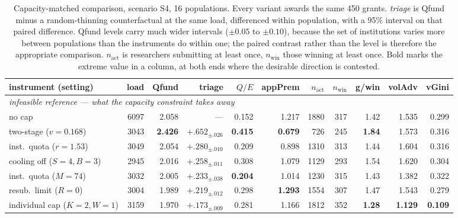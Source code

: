\documentclass[11pt,a4paper]{article}
\begin{document}
\begin{table}[!htbp]
\centering
\footnotesize
\setlength{\tabcolsep}{3.6pt}
\caption{Capacity-matched comparison, scenario S4, 16 populations. Every variant
awards the same 450 grants. \emph{triage} is Qfund minus a random-thinning
counterfactual at the same load, differenced within population, with a 95\%
interval on that paired difference. Qfund levels carry much wider intervals
($\pm0.05$ to $\pm0.10$), because the set of institutions varies more between
populations than the instruments do within one; the paired contrast rather than
the level is therefore the appropriate comparison. $n_{\text{act}}$ is
researchers submitting at least once, $n_{\text{win}}$ those winning at least
once. Bold marks the extreme value in a column, at both ends where the desirable
direction is contested.}
\label{tab:cap}
\begin{tabular}{lrrrrrrrrrr}
\toprule
instrument (setting) & load & Qfund & triage & $Q/E$ & appPrem & $n_{\text{act}}$ & $n_{\text{win}}$ & g/win & volAdv & vGini \\
\midrule
\multicolumn{11}{l}{\textit{infeasible reference --- what the capacity constraint takes away}}\\
no cap                         & 6097 & 2.058 & ---  & 0.152 & 1.217 & 1880 & 317 & 1.42 & 1.535 & 0.299 \\
\midrule
two-stage ($v{=}0.168$)        & 3043 & \textbf{2.426} & $+.652_{\pm.026}$ & \textbf{0.415} & \textbf{0.679} &  726 & 245 & \textbf{1.84} & 1.573 & 0.316 \\
inst.\ quota ($r{=}1.53$)      & 3049 & 2.054 & $+.280_{\pm.010}$ & 0.209 & 0.898 & 1310 & 313 & 1.44 & 1.604 & 0.316 \\
cooling off ($S{=}4,B{=}3$)    & 2945 & 2.016 & $+.258_{\pm.011}$ & 0.308 & 1.079 & 1129 & 293 & 1.54 & 1.620 & 0.304 \\
inst.\ quota ($M{=}74$)        & 3032 & 2.005 & $+.233_{\pm.038}$ & \textbf{0.204} & 1.014 & 1230 & 315 & 1.43 & 1.382 & 0.322 \\
resub.\ limit ($R{=}0$)        & 3004 & 1.989 & $+.219_{\pm.012}$ & 0.298 & \textbf{1.293} & 1554 & 307 & 1.47 & 1.543 & 0.279 \\
individual cap ($K{=}2,W{=}1$) & 3159 & 1.970 & $+.173_{\pm.009}$ & 0.281 & 1.166 & 1812 & 352 & \textbf{1.28} & \textbf{1.129} & \textbf{0.109} \\
\bottomrule
\end{tabular}
\end{table}
\end{document}
